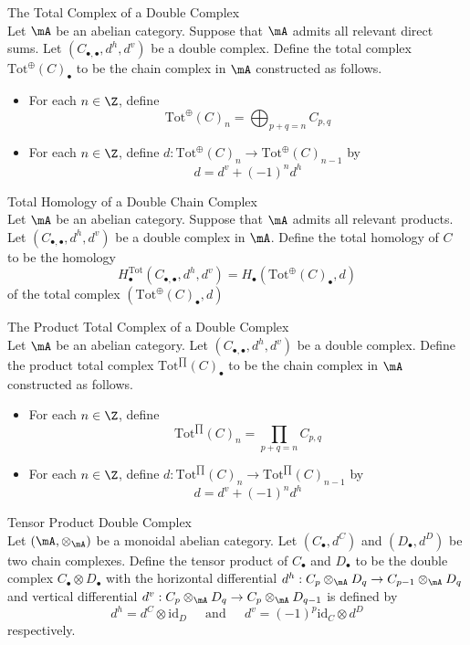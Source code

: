 \documentclass[a4paper]{article}
\begin{document}
\begin{defn}{The Total Complex of a Double Complex}{}\\
Let $\mA$ be an abelian category. Suppose that $\mA$ admits all relevant direct sums. Let $(C_{\bullet,\bullet},d^h,d^v)$ be a double complex. Define the total complex $\text{Tot}^\oplus(C)_\bullet$ to be the chain complex in $\mA$ constructed as follows. 
\begin{itemize}
\item For each $n\in\Z$, define $$\text{Tot}^\oplus(C)_n=\bigoplus_{p+q=n}C_{p,q}$$
\item For each $n\in\Z$, define $d:\text{Tot}^\oplus(C)_n\to\text{Tot}^\oplus(C)_{n-1}$ by $$d=d^v+(-1)^nd^h$$
\end{itemize}
\end{defn}

\begin{defn}{Total Homology of a Double Chain Complex}{}\\
Let $\mA$ be an abelian category. Suppose that $\mA$ admits all relevant products. Let $(C_{\bullet,\bullet},d^h,d^v)$ be a double complex in $\mA$. Define the total homology of $C$ to be the homology $$H_\bullet^\text{Tot}(C_{\bullet,\bullet},d^h,d^v)=H_\bullet(\text{Tot}^\oplus(C)_\bullet,d)$$ of the total complex $(\text{Tot}^\oplus(C)_\bullet,d)$
\end{defn}

\begin{defn}{The Product Total Complex of a Double Complex}{}\\
Let $\mA$ be an abelian category. Let $(C_{\bullet,\bullet},d^h,d^v)$ be a double complex. Define the product total complex $\text{Tot}^{\prod}(C)_\bullet$ to be the chain complex in $\mA$ constructed as follows. 
\begin{itemize}
\item For each $n\in\Z$, define $$\text{Tot}^{\prod}(C)_n=\prod_{p+q=n}C_{p,q}$$
\item For each $n\in\Z$, define $d:\text{Tot}^{\prod}(C)_n\to\text{Tot}^{\prod}(C)_{n-1}$ by $$d=d^v+(-1)^nd^h$$
\end{itemize}
\end{defn}

\begin{defn}{Tensor Product Double Complex}{}\\
Let $(\mA,\otimes_\mA)$ be a monoidal abelian category. Let $(C_\bullet,d^C)$ and $(D_\bullet,d^D)$ be two chain complexes. Define the tensor product of $C_\bullet$ and $D_\bullet$ to be the double complex $C_\bullet\otimes D_\bullet$ with the horizontal differential $d^h:C_p\otimes_\mA D_q\to C_{p-1}\otimes_\mA D_q$ and vertical differential $d^v:C_p\otimes_\mA D_q\to C_p\otimes_\mA D_{q-1}$ is defined by $$d^h=d^C\otimes\text{id}_D\;\;\;\;\text{ and }\;\;\;\;d^v=(-1)^p\text{id}_C\otimes d^D$$ respectively. 
\end{defn}
\end{document}
